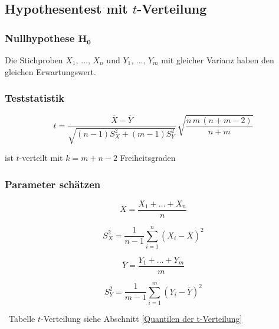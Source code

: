 \subsection[Hypothesentest mit t-Verteilung]{Hypothesentest mit $t$-Verteilung}

\subsubsection{Nullhypothese $\bm{H_0}$}

Die Stichproben $X_1,\, \ldots , \, X_n \text{ und } Y_1, \, \ldots , \, Y_m$ mit gleicher Varianz haben den gleichen Erwartungswert. 


\subsubsection{Teststatistik}

$$ t = \frac{\overline{X} - \overline{Y}}{\sqrt{(n-1) S_X^2 + (m-1) S_Y^2}} \, \sqrt{\frac{n \, m \, (n+m-2)}{n+m}} $$

ist $t$-verteilt mit $k = m+n-2$ Freiheitsgraden


\subsubsection{Parameter schätzen}

\begin{minipage}[c]{0.48\columnwidth}
	$$ \overline{X} = \frac{X_1 + \ldots + X_n}{n} $$
\end{minipage}
\hfill
\begin{minipage}[c]{0.48\columnwidth}
	$$ S_X^2 = \frac{1}{n-1} \sum\limits_{i=1}^n (X_i - \overline{X})^2 $$
\end{minipage}

\vspace{0.2cm}

\begin{minipage}[c]{0.48\columnwidth}
	$$ \overline{Y} = \frac{Y_1+ \ldots + Y_m}{m} $$
\end{minipage}
\hfill
\begin{minipage}[c]{0.48\columnwidth}
	$$ S_Y^2 = \frac{1}{m-1} \sum\limits_{i=1}^m (Y_i - \overline{Y})^2 $$
\end{minipage}

\vspace{0.2cm}

\textrightarrow\ Tabelle $t$-Verteilung siehe Abschnitt \ref{Quantilen der t-Verteilung}


